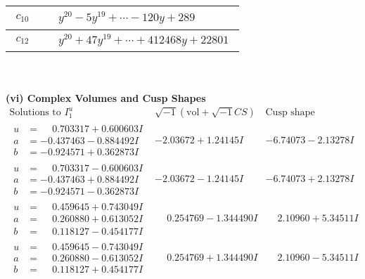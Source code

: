 \documentclass[1p]{elsarticle_modified}
\theoremstyle{definition}
\newcommand{\I}{\sqrt{-1}}
\begin{document}
\begin{tabular}{m{50pt}|m{274pt}}
\hline $$\begin{aligned}c_{10}\end{aligned}$$&$\begin{aligned}
&y^{20}-5 y^{19}+\cdots-120 y+289
\end{aligned}$\\
\hline $$\begin{aligned}c_{12}\end{aligned}$$&$\begin{aligned}
&y^{20}+47 y^{19}+\cdots+412468 y+22801
\end{aligned}$\\
\hline
\end{tabular}\\~\\
\newpage\flushleft \textbf{(vi) Complex Volumes and Cusp Shapes}
$$\begin{array}{c|c|c}  
\text{Solutions to }I^u_{1}& \I (\text{vol} + \sqrt{-1}CS) & \text{Cusp shape}\\
 \hline 
\begin{aligned}
u &= \phantom{-}0.703317 + 0.600603 I \\
a &= -0.437463 - 0.884492 I \\
b &= -0.924571 + 0.362873 I\end{aligned}
 & -2.03672 + 1.24145 I & -6.74073 - 2.13278 I \\ \hline\begin{aligned}
u &= \phantom{-}0.703317 - 0.600603 I \\
a &= -0.437463 + 0.884492 I \\
b &= -0.924571 - 0.362873 I\end{aligned}
 & -2.03672 - 1.24145 I & -6.74073 + 2.13278 I \\ \hline\begin{aligned}
u &= \phantom{-}0.459645 + 0.743049 I \\
a &= \phantom{-}0.260880 + 0.613052 I \\
b &= \phantom{-}0.118127 - 0.454177 I\end{aligned}
 & \phantom{-}0.254769 - 1.344490 I & \phantom{-}2.10960 + 5.34511 I \\ \hline\begin{aligned}
u &= \phantom{-}0.459645 - 0.743049 I \\
a &= \phantom{-}0.260880 - 0.613052 I \\
b &= \phantom{-}0.118127 + 0.454177 I\end{aligned}
 & \phantom{-}0.254769 + 1.344490 I & \phantom{-}2.10960 - 5.34511 I \\ \hline\begin{aligned}

\end{aligned}
\end{array}$$
\end{document}
